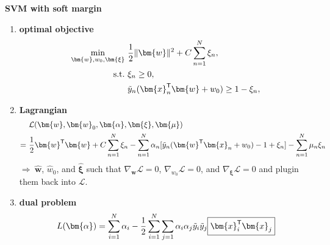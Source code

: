 \textbf{SVM with soft margin}
    \begin{enumerate}[(1)]
        \item \textbf{optimal objective}
        \begin{align}
            \min_{\bm{w},w_0,\bm{\xi}}&~\frac{1}{2}\|\bm{w}\|^2+C\sum_{n=1}^{N}\xi_n, \\
            \mathrm{s.t.}&~\xi_n \geq 0,\\
            &~ \Tilde{y}_n(\bm{x}_n^\mathsf{T}\bm{w}+w_0)\geq 1 - \xi_n,
        \end{align}
        
        \item \textbf{Lagrangian}
        {\small\begin{align}
            &~\mathcal{L}(\bm{w},\bm{w}_0,\bm{\alpha},\bm{\xi},\bm{\mu})\\
            =&~ \frac{1}{2}\bm{w}^\mathsf{T}\bm{w} + C\sum_{n=1}^N\xi_n
            - \sum_{n=1}^N\alpha_n[\Tilde{y}_n(\bm{w}^\mathsf{T}\bm{x}_n+w_0)-1+\xi_n]
            -\sum_{n=1}^N\mu_n\xi_n
        \end{align}}
        $\Rightarrow~\hat{\bm{w}}$, $\hat{w}_0$, and $\hat{\bm{\xi}}$ 
        such that $\nabla_{\bm{w}}\mathcal{L}=0$, $\nabla_{w_0}\mathcal{L}=0$, and $\nabla_{\bm{\xi}}\mathcal{L}=0$ 
        and plugin them back into $\mathcal{L}$.
    
        \item \textbf{dual problem}
        \begin{gather}
            L(\bm{\alpha})
            = \sum_{i=1}^N\alpha_i - \frac{1}{2}\sum_{i=1}^N\sum_{j=1}\alpha_i\alpha_j\Tilde{y}_i\Tilde{y}_j\boxed{\bm{x}_i^\mathsf{T}\bm{x}_j}
        \end{gather}
    

\end{enumerate}
